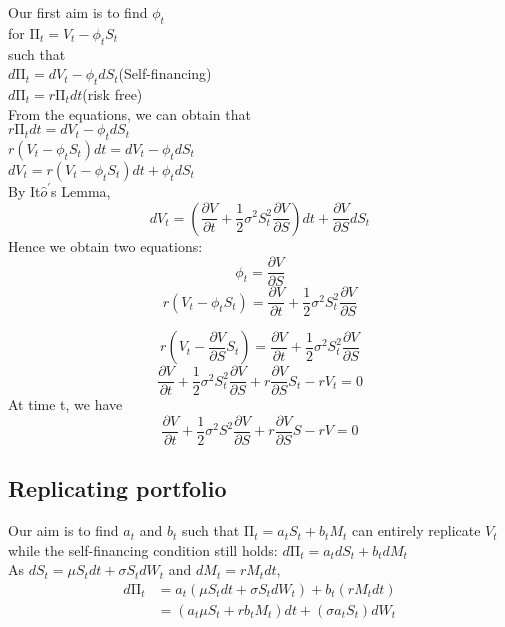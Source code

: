 \begin{center}
Our first aim is to find $\phi_{t}$\\[1mm]
for $\mathrm{\Pi}_{t} = V_{t} - \phi_{t}S_{t}$\\[3mm]
such that\\[1mm]
$d\mathrm{\Pi}_{t} = dV_{t} - \phi_{t}dS_{t}$(Self-financing)\\[1mm]
$d\mathrm{\Pi}_{t} = r\mathrm{\Pi}_{t}dt$(risk free)\\[3mm]
From the equations, we can obtain that\\[1mm]
$r\mathrm{\Pi}_{t}dt = dV_{t} - \phi_{t}dS_{t}$\\[1mm]
$r(V_{t} - \phi_{t}S_{t})dt = dV_{t} - \phi_{t}dS_{t}$\\[1mm]
$dV_{t}  = r(V_{t} - \phi_{t}S_{t})dt + \phi_{t}dS_{t}$\\[1mm]
By It$\hat{o}^{\prime}$s Lemma, $$dV_{t} = (\frac{\partial V}{\partial t}+\frac{1}{2}\sigma^{2}S_{t}^{2}\frac{\partial V}{\partial S})dt + \frac{\partial V}{\partial S}dS_{t}$$
Hence we obtain two equations:
$$\phi_{t} = \frac{\partial V}{\partial S}$$
$$r(V_{t} - \phi_{t}S_{t}) = \frac{\partial V}{\partial t}+\frac{1}{2}\sigma^{2}S_{t}^{2}\frac{\partial V}{\partial S}$$
\end{center}

\begin{center}
$$r(V_{t} - \frac{\partial V}{\partial S}S_{t}) = \frac{\partial V}{\partial t}+\frac{1}{2}\sigma^{2}S_{t}^{2}\frac{\partial V}{\partial S}$$
$$\frac{\partial V}{\partial t}+\frac{1}{2}\sigma^{2}S_{t}^{2}\frac{\partial V}{\partial S} + r\frac{\partial V}{\partial S}S_{t} - rV_{t} = 0$$
At time t, we have
$$\frac{\partial V}{\partial t}+\frac{1}{2}\sigma^{2}S^{2}\frac{\partial V}{\partial S} + r\frac{\partial V}{\partial S}S - rV = 0$$
\end{center}
\newpage

\subsection{Replicating portfolio}

\begin{center}
Our aim is to find $a_{t}$ and $b_{t}$ such that $\mathrm{\Pi}_{t} = a_{t}S_{t} + b_{t}M_{t}$ can entirely replicate $V_{t}$\\[2mm]
while the self-financing condition still holds: $d\mathrm{\Pi}_{t} = a_{t}dS_{t} + b_{t}dM_{t}$\\[5mm]
As $dS_{t} = \mu S_{t}dt + \sigma S_{t}dW_{t}$ and $dM_{t}  = rM_{t}dt$,
\begin{equation*}
\begin{split}
d\mathrm{\Pi}_{t} 
&= a_{t}(\mu S_{t}dt + \sigma S_{t}dW_{t}) + b_{t}(rM_{t}dt)\\
&= (a_{t}\mu S_{t} + rb_{t}M_{t})dt + (\sigma a_{t}S_{t})dW_{t}\\
\end{split}
\end{equation*}
\end{center}

